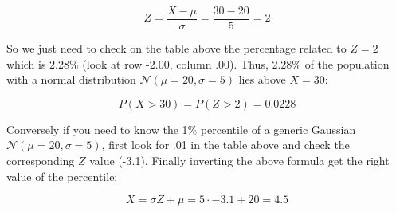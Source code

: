 \[Z=\frac{X-\mu}{\sigma} = \frac{30-20}{5}=2\]

So we just need to check on the table above the percentage related to
\(Z=2\) which is 2.28\% (look at row -2.00, column .00). Thus, 2.28\% of
the population with a normal distribution
\(\mathcal{N}(\mu=20 ,\sigma=5)\) lies above \(X=30\):

\[P(X>30)=P(Z>2)=0.0228\]

Conversely if you need to know the 1\% percentile of a generic Gaussian
\(\mathcal{N}(\mu=20 ,\sigma=5)\), first look for .01 in the table above
and check the corresponding \(Z\) value (-3.1). Finally inverting the
above formula get the right value of the percentile:

\[ X= \sigma Z + \mu = 5\cdot -3.1 + 20 = 4.5 \]
